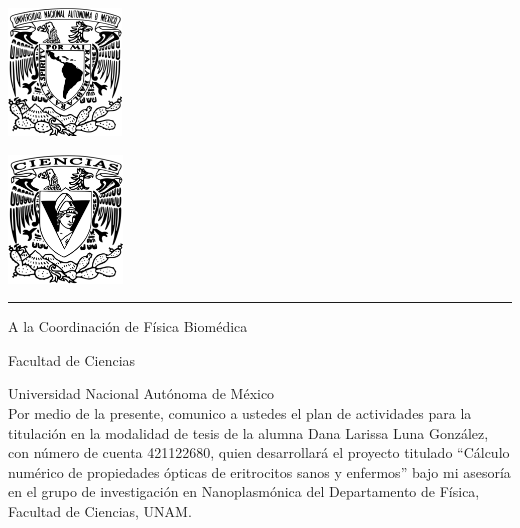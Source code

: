 \documentclass[11pt,letterpaper]{article}
\begin{document}
	
	
	\begin{center}
		\begin{minipage}{3cm}
			\begin{center}
				\includegraphics[height=3.4cm]{Logo_UNAM (1)}
			\end{center}
		\end{minipage}\hfill
		\begin{minipage}{3cm}
			\begin{center}
				\includegraphics[height=3.4cm]{Logo_FC (1)}
			\end{center}
		\end{minipage}
	\end{center}
	
	\rule{17cm}{0.1mm}
	
	\vspace{0.5cm}
	
	\hspace{10cm}{\raggedleft Ciudad Universitaria, 10 de abril de 2025.}
	
	\hspace{1cm}
	
	\vspace{0.5cm}
	
	A la Coordinación de Física Biomédica
	
	Facultad de Ciencias
	
	Universidad Nacional Autónoma de México\\
	
	Por medio de la presente, comunico a ustedes el plan de actividades para la titulación en la modalidad de tesis de la alumna Dana Larissa Luna González, con número de cuenta 421122680, quien desarrollará el proyecto titulado ``Cálculo numérico de propiedades ópticas de eritrocitos sanos y enfermos'' bajo mi asesoría en el grupo de investigación en Nanoplasmónica del Departamento de Física, Facultad de Ciencias, UNAM.\\
	
\end{document}
